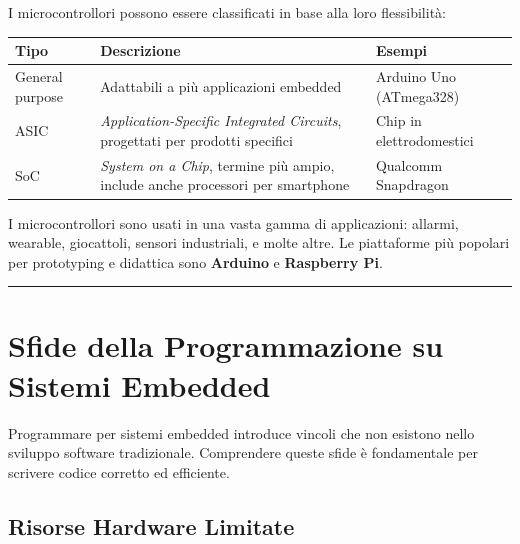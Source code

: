 \documentclass[
  italian,
  openany]{book}
\newcounter{none} %
\begin{document}
I microcontrollori possono essere classificati in base alla loro
flessibilità:

{\def\LTcaptype{none} %
\begin{longtable}[]{@{}
  >{\raggedright\arraybackslash}p{}
  >{\raggedright\arraybackslash}p{}
  >{\raggedright\arraybackslash}p{}@{}}
\toprule\noalign{}
\begin{minipage}[b]{\linewidth}\raggedright
Tipo
\end{minipage} & \begin{minipage}[b]{\linewidth}\raggedright
Descrizione
\end{minipage} & \begin{minipage}[b]{\linewidth}\raggedright
Esempi
\end{minipage} \\
\midrule\noalign{}
\endhead
\bottomrule\noalign{}
\endlastfoot
General purpose & Adattabili a più applicazioni embedded & Arduino Uno
(ATmega328) \\
ASIC & \emph{Application-Specific Integrated Circuits}, progettati per
prodotti specifici & Chip in elettrodomestici \\
SoC & \emph{System on a Chip}, termine più ampio, include anche
processori per smartphone & Qualcomm Snapdragon \\
\end{longtable}
}

I microcontrollori sono usati in una vasta gamma di applicazioni:
allarmi, wearable, giocattoli, sensori industriali, e molte altre. Le
piattaforme più popolari per prototyping e didattica sono
\textbf{Arduino} e \textbf{Raspberry Pi}.

\begin{center}\rule{0.5\linewidth}{0.5pt}\end{center}

\section{Sfide della Programmazione su Sistemi
Embedded}\label{sfide-della-programmazione-su-sistemi-embedded}

Programmare per sistemi embedded introduce vincoli che non esistono
nello sviluppo software tradizionale. Comprendere queste sfide è
fondamentale per scrivere codice corretto ed efficiente.

\subsection{Risorse Hardware Limitate}\label{risorse-hardware-limitate}
\end{document}
